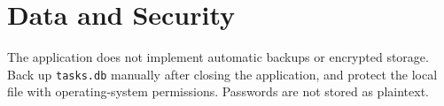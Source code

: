\documentclass[11pt,a4paper]{article}
\begin{document}
\section{Data and Security}
The application does not implement automatic backups or encrypted storage. Back up \texttt{tasks.db} manually after closing the application, and protect the local file with operating-system permissions. Passwords are not stored as plaintext.
\end{document}
